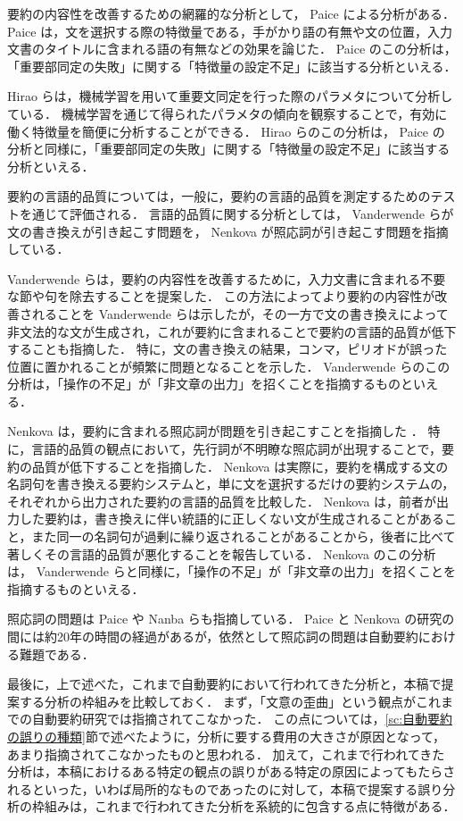 要約の内容性を改善するための網羅的な分析として， Paice による分析がある\cite{paice90}．
Paice は，文を選択する際の特徴量である，手がかり語の有無や文の位置，入力文書のタイトルに含まれる語の有無などの効果を論じた．
Paice のこの分析は，「重要部同定の失敗」に関する「特徴量の設定不足」に該当する分析といえる．

Hirao らは，機械学習を用いて重要文同定を行った際のパラメタについて分析している\cite{hirao02}．
機械学習を通じて得られたパラメタの傾向を観察することで，有効に働く特徴量を簡便に分析することができる．
Hirao らのこの分析は， Paice の分析と同様に，「重要部同定の失敗」に関する「特徴量の設定不足」に該当する分析といえる．

要約の言語的品質については，一般に，要約の言語的品質を測定するためのテスト\cite{nist07}を通じて評価される．
言語的品質に関する分析としては， Vanderwende らが文の書き換えが引き起こす問題を\cite{vanderwende07}， Nenkova が照応詞が引き起こす問題を指摘している\cite{nenkova08}．

Vanderwende らは，要約の内容性を改善するために，入力文書に含まれる不要な節や句を除去することを提案した\cite{vanderwende07}．
この方法によってより要約の内容性が改善されることを Vanderwende らは示したが，その一方で文の書き換えによって非文法的な文が生成され，これが要約に含まれることで要約の言語的品質が低下することも指摘した．
特に，文の書き換えの結果，コンマ，ピリオドが誤った位置に置かれることが頻繁に問題となることを示した．
Vanderwende らのこの分析は，「操作の不足」が「非文章の出力」を招くことを指摘するものといえる．

Nenkova は，要約に含まれる照応詞が問題を引き起こすことを指摘した\cite{nenkova08} ．
特に，言語的品質の観点において，先行詞が不明瞭な照応詞が出現することで，要約の品質が低下することを指摘した．
Nenkova は実際に，要約を構成する文の名詞句を書き換える要約システムと，単に文を選択するだけの要約システムの，それぞれから出力された要約の言語的品質を比較した．
Nenkova は，前者が出力した要約は，書き換えに伴い統語的に正しくない文が生成されることがあること，また同一の名詞句が過剰に繰り返されることがあることから，後者に比べて著しくその言語的品質が悪化することを報告している．
Nenkova のこの分析は， Vanderwende らと同様に，「操作の不足」が「非文章の出力」を招くことを指摘するものといえる．

照応詞の問題は Paice \cite{paice90} や Nanba ら\cite{nanba00}も指摘している．
Paice \cite{paice90} と Nenkova \cite{nenkova08}の研究の間には約20年の時間の経過があるが，依然として照応詞の問題は自動要約における難題である．

最後に，上で述べた，これまで自動要約において行われてきた分析と，本稿で提案する分析の枠組みを比較しておく．
まず，「文意の歪曲」という観点がこれまでの自動要約研究では指摘されてこなかった．
この点については，\ref{sc:自動要約の誤りの種類}節で述べたように，分析に要する費用の大きさが原因となって，あまり指摘されてこなかったものと思われる．
加えて，これまで行われてきた分析は，本稿におけるある特定の観点の誤りがある特定の原因によってもたらされるといった，いわば局所的なものであったのに対して，本稿で提案する誤り分析の枠組みは，これまで行われてきた分析を系統的に包含する点に特徴がある．


